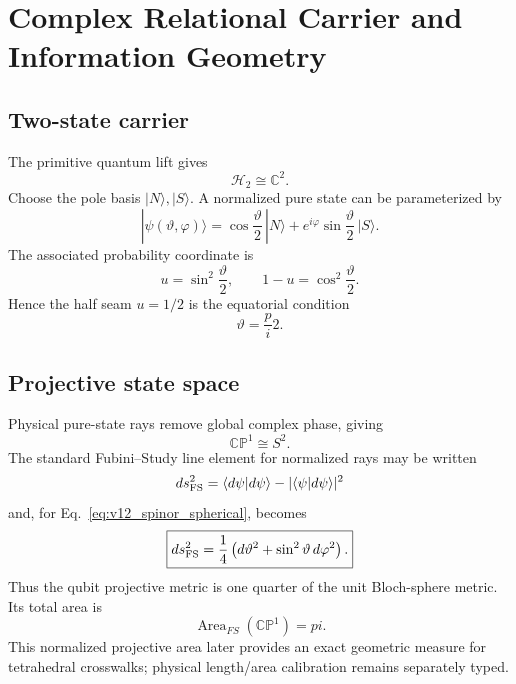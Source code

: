 \documentclass[11pt,a4paper,twoside]{book}
\def\pi{pi}%
\theoremstyle{definition}
\begin{document}
\clearpage

\chapter{Complex Relational Carrier and Information Geometry}
\label{ch:v12_complex_carrier}

\section{Two-state carrier}

The primitive quantum lift gives
\begin{equation}
\mathcal H_2\cong\mathbb C^2.
\end{equation}
Choose the pole basis $|N\rangle,|S\rangle$. A normalized pure state can be parameterized by
\begin{equation}
\boxed{
|\psi(\vartheta,\varphi)\rangle
=\cos\frac\vartheta2\,|N\rangle
+e^{i\varphi}\sin\frac\vartheta2\,|S\rangle.
}
\label{eq:v12_spinor_spherical}
\end{equation}
The associated probability coordinate is
\begin{equation}
u=\sin^2\frac\vartheta2,
\qquad
1-u=\cos^2\frac\vartheta2.
\end{equation}
Hence the half seam $u=1/2$ is the equatorial condition
\begin{equation}
\vartheta=\frac\pi2.
\end{equation}

\section{Projective state space}

Physical pure-state rays remove global complex phase, giving
\begin{equation}
\boxed{\mathbb{CP}^1\cong S^2.}
\label{eq:v12_cp1_s2}
\end{equation}
The standard Fubini--Study line element for normalized rays may be written
\begin{equation}
 ds_{\rm FS}^2
=\langle d\psi|d\psi\rangle
-|\langle\psi|d\psi\rangle|^2
\label{eq:v12_fs_general}
\end{equation}
and, for Eq.~\eqref{eq:v12_spinor_spherical}, becomes
\begin{equation}
\boxed{
 ds_{\rm FS}^2
=\frac14\left(d\vartheta^2+\sin^2\vartheta\,d\varphi^2\right).
}
\label{eq:v12_fs_qubit}
\end{equation}
Thus the qubit projective metric is one quarter of the unit Bloch-sphere metric. Its total area is
\begin{equation}
\boxed{\operatorname{Area}_{FS}(\mathbb{CP}^1)=\pi.}
\end{equation}
This normalized projective area later provides an exact geometric measure for tetrahedral crosswalks; physical length/area calibration remains separately typed.
\end{document}

